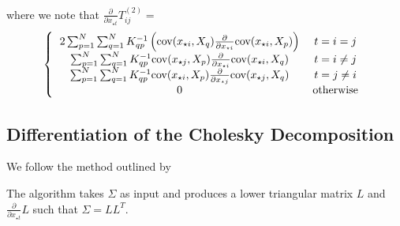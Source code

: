 \documentclass[phd,tocprelim]{cornell}
\begin{document}
where we note that $\frac{\partial}{\partial x_{\star t}} T^{(2)}_{ij} = $
\begin{equation}
    \left\{ \begin{tabular}{cc}
        $2 \sum_{p = 1}^{N} \sum_{q = 1}^{N} K^{-1}_{qp} \left( \mbox{cov}(x_{\star i}, X_{q}) \frac{\partial}{\partial x_{\star i}} \mbox{cov}(x_{\star i}, X_{p}) \right)$ & $t = i = j$ \\
        $\sum_{p = 1}^{N} \sum_{q = 1}^{N} K^{-1}_{qp} \mbox{cov}(x_{\star j}, X_{p}) \frac{\partial}{\partial x_{\star i}} \mbox{cov}(x_{\star i}, X_{q})$ & $t = i \neq j$ \\
							$\sum_{p = 1}^{N} \sum_{q = 1}^{N} K^{-1}_{qp} \mbox{cov}(x_{\star i}, X_{p}) \frac{\partial}{\partial x_{\star j}} \mbox{cov}(x_{\star j}, X_{q})$ & $t = j \neq i$ \\
							$0$ & otherwise
                                                      \end{tabular} \right.
\end{equation}

\subsection{Differentiation of the Cholesky Decomposition}

We follow the method outlined by \cite{Smith1995}

The algorithm takes $\Sigma$ as input and produces a lower triangular matrix $L$ and $\frac{\partial}{\partial x_{\star t}} L$ such that $\Sigma = LL^{T}$.
\end{document}
